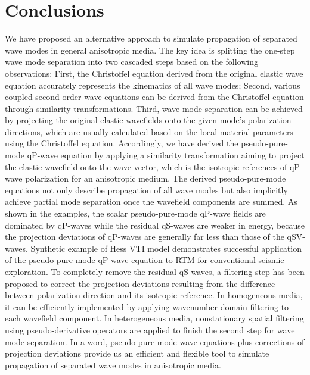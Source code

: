 \section{Conclusions}
We have proposed an alternative approach 
to simulate propagation of separated wave modes in general anisotropic media.
The key idea is splitting the one-step wave mode separation into two cascaded steps based on the following
observations: First, the Christoffel equation derived from the original elastic wave equation 
accurately represents the kinematics of all wave modes; Second, various coupled 
second-order wave equations can be derived from the Christoffel equation
through similarity transformations. Third, wave mode separation can be achieved by projecting the original
elastic wavefields onto the given mode's polarization directions, which are usually calculated 
based on the local material parameters using the Christoffel equation.
Accordingly, we have derived the pseudo-pure-mode qP-wave equation by applying a similarity transformation 
aiming to project the elastic wavefield onto the wave vector, which
is the isotropic references of qP-wave polarization for an anisotropic medium.
The derived pseudo-pure-mode equations not only describe propagation of all wave modes
but also implicitly achieve partial mode separation once the wavefield components are summed.
As shown in the examples,
the scalar pseudo-pure-mode qP-wave fields
are dominated by qP-waves while the residual
 qS-waves are weaker in energy, because the projection deviations of qP-waves are generally far less than those of the qSV-waves.
Synthetic example of Hess VTI model demonstrates successful application of the pseudo-pure-mode qP-wave
equation to RTM for conventional seismic exploration.
To completely remove the residual qS-waves, a filtering step has been proposed 
to correct the projection
 deviations resulting from the difference between polarization direction and its isotropic reference.
In homogeneous media, it can be efficiently implemented by applying wavenumber domain filtering to each
 wavefield component. In heterogeneous media, nonstationary spatial filtering using 
pseudo-derivative operators are applied to finish the second step for wave mode separation.
In a word, pseudo-pure-mode wave equations plus corrections of projection deviations provide us an efficient
and flexible tool to simulate propagation of separated wave modes in anisotropic media.

